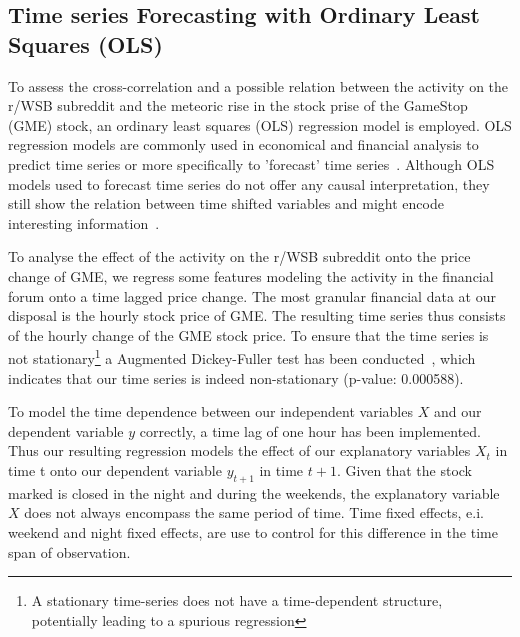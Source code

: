 \documentclass[noacm,sigconf,authorversion]{acmart}
\begin{document}
\subsection{Time series Forecasting with Ordinary Least Squares (OLS)}
To assess the cross-correlation and a possible relation between the activity on the r/WSB subreddit and the meteoric rise in the stock prise of the GameStop (GME) stock,  an ordinary least squares (OLS) regression model is employed. OLS regression models are commonly used in economical and financial analysis to predict time series or more specifically to 'forecast' time series~\cite{stock2015introduction}. Although OLS models used to forecast time series do not offer any causal interpretation, they still show the relation between time shifted variables and might encode interesting information~\cite{stock2015introduction}. \par
To analyse the effect of the activity on the r/WSB subreddit onto the price change of GME, we regress some features modeling the activity in the financial forum onto a time lagged price change. The most granular financial data at our disposal is the hourly stock price of GME. The resulting time series thus consists of the hourly change of the GME stock price. To ensure that the time series is not stationary\footnote{A stationary time-series does not have a time-dependent structure, potentially leading to a spurious regression} a Augmented Dickey-Fuller test has been conducted~\cite{mushtaq2011augmented}, which indicates that our time series is indeed non-stationary (p-value: 0.000588). \par
To model the time dependence between our independent variables $X$ and our dependent variable $y$ correctly, a time lag of one hour has been implemented. Thus our resulting regression models the effect of our explanatory variables $X_t$ in time t onto our dependent variable $y_{t+1}$ in time $t+1$. Given that the stock marked is closed in the night and during the weekends, the explanatory variable $X$ does not always encompass the same period of time. Time fixed effects, e.i. weekend and night fixed effects, are use to control for this difference in the time span of observation. \par
\end{document}
